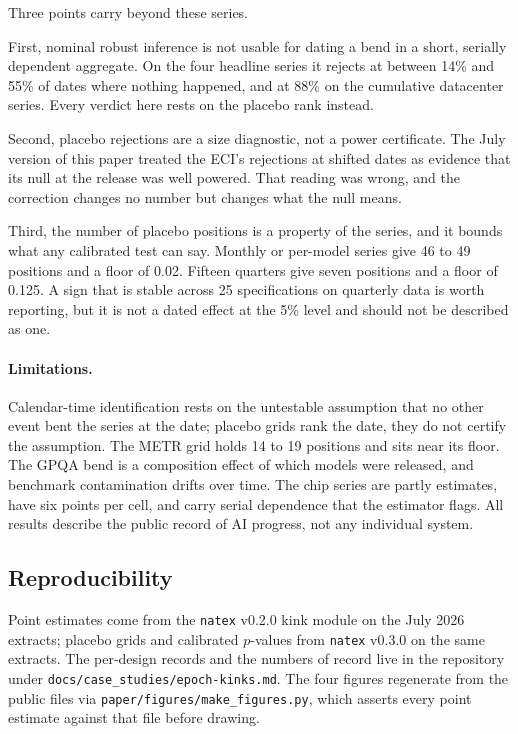 \documentclass[11pt]{article}
\newcommand{\natex}{\texttt{natex}}
\begin{document}
Three points carry beyond these series.

First, nominal robust inference is not usable for dating a bend in a short, serially
dependent aggregate. On the four headline series it rejects at between 14\% and 55\% of
dates where nothing happened, and at 88\% on the cumulative datacenter series. Every
verdict here rests on the placebo rank instead.

Second, placebo rejections are a size diagnostic, not a power certificate. The July
version of this paper treated the ECI's rejections at shifted dates as evidence that its
null at the release was well powered. That reading was wrong, and the correction changes
no number but changes what the null means.

Third, the number of placebo positions is a property of the series, and it bounds what
any calibrated test can say. Monthly or per-model series give 46 to 49 positions and a
floor of 0.02. Fifteen quarters give seven positions and a floor of 0.125. A sign that
is stable across 25 specifications on quarterly data is worth reporting, but it is not a
dated effect at the 5\% level and should not be described as one.

\paragraph{Limitations.} Calendar-time identification rests on the untestable assumption
that no other event bent the series at the date; placebo grids rank the date, they do
not certify the assumption. The METR grid holds 14 to 19 positions and sits near its
floor. The GPQA bend is a composition effect of which models were released, and
benchmark contamination drifts over time. The chip series are partly estimates, have
six points per cell, and carry serial dependence that the estimator flags. All results
describe the public record of AI progress, not any individual system.

\subsection*{Reproducibility}

Point estimates come from the \natex{} v0.2.0 kink module on the July 2026 extracts;
placebo grids and calibrated $p$-values from \natex{} v0.3.0 on the same extracts. The
per-design records and the numbers of record live in the repository under
\texttt{docs/case\_studies/epoch-kinks.md}. The four figures regenerate from the public
files via \texttt{paper/figures/make\_figures.py}, which asserts every point estimate
against that file before drawing.
\end{document}
